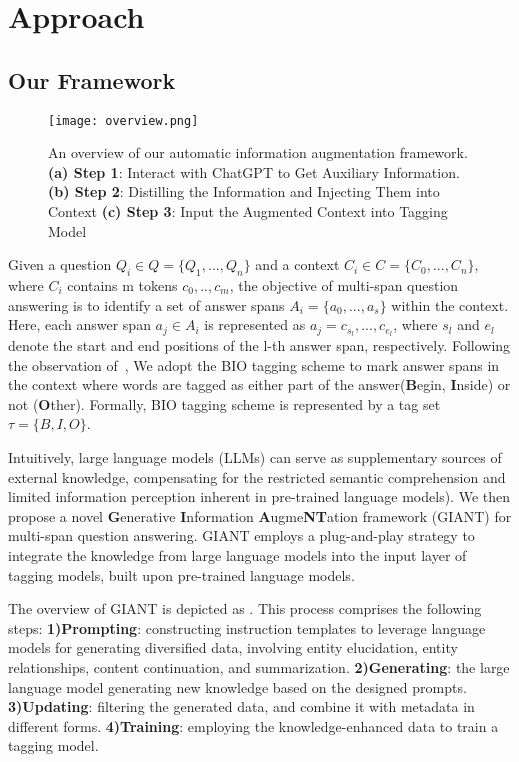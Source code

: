 \section{Approach}
\subsection{Our Framework}
\begin{figure*}[h]
	\centering
	\texttt{[image: overview.png]}
	\caption{An overview of our automatic information augmentation framework. \textbf{(a) Step 1}: Interact with ChatGPT to Get Auxiliary Information. \textbf{(b) Step 2}: Distilling the Information and Injecting Them into Context \textbf{(c) Step 3}: Input the Augmented Context into Tagging Model}
	\label{fig:overview}
\end{figure*}   

 Given a question $Q_i \in Q = \{Q_1,...,Q_n\}$ and a context $C_i \in C = \{C_0,...,C_n\}$, where $C_i$ contains m tokens $c_0,..,c_m$, the objective of multi-span question answering is to identify a set of answer spans $A_i = \{a_0,...,a_s\}$ within the context. Here, each answer span $a_j \in A_i$ is represented as $a_j = c_{s_l},...,c_{e_l}$, where $s_l$ and $e_l$ denote the start and end positions of the l-th answer span, respectively.
 Following the observation of~\cite{li2022multispanqa}, We adopt the BIO tagging scheme to mark answer spans in the context where words are tagged as either part of the answer(\textbf{B}egin, \textbf{I}nside) or not (\textbf{O}ther). Formally, BIO tagging scheme is represented by a tag set $\tau = \{B, I, O\}$.

 Intuitively, large language models (LLMs) can serve as supplementary sources of external knowledge, compensating for the restricted semantic comprehension and limited information perception inherent in pre-trained language models). 
 We then propose a novel \textbf{G}enerative \textbf{I}nformation \textbf{A}ugme\textbf{NT}ation framework (GIANT) for multi-span question answering.
 GIANT employs a plug-and-play strategy to integrate the knowledge from large language models into the input layer of tagging models, built upon pre-trained language models.
 
 
 The overview of GIANT is depicted as .
 This process comprises the following steps:
 \textbf{1)Prompting}: constructing instruction templates to leverage language models for generating diversified data, involving entity elucidation, entity relationships, content continuation, and summarization.
 \textbf{2)Generating}: the large language model generating new knowledge based on the designed prompts.
 \textbf{3)Updating}: filtering the generated data, and combine it with metadata in different forms.
 \textbf{4)Training}: employing the knowledge-enhanced data to train a tagging model.

